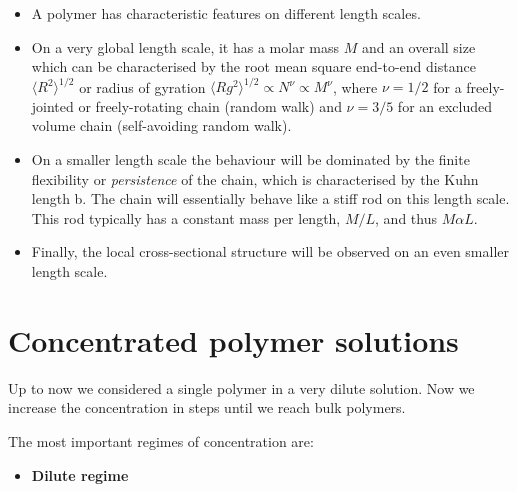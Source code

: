 \documentclass[
  letterpaper,
  enabledeprecatedfontcommands]{report}
\providecommand{\tightlist}{%
  \setlength{\itemsep}{0pt}\setlength{\parskip}{0pt}}
\begin{document}
\begin{tcolorbox}[enhanced jigsaw, toprule=.15mm, opacityback=0, colbacktitle=quarto-callout-important-color!10!white, title=\textcolor{quarto-callout-important-color}{\faExclamation}\hspace{0.5em}{Check your understanding}, leftrule=.75mm, rightrule=.15mm, bottomtitle=1mm, breakable, colframe=quarto-callout-important-color-frame, colback=white, toptitle=1mm, left=2mm, titlerule=0mm, coltitle=black, arc=.35mm, bottomrule=.15mm, opacitybacktitle=0.6]

\begin{itemize}
\item
  A polymer has characteristic features on different length scales.
\item
  On a very global length scale, it has a molar mass \(M\) and an
  overall size which can be characterised by the root mean square
  end-to-end distance \(\langle R^{2}\rangle^{1 / 2}\) or radius of
  gyration
  \(\langle R g^{2}\rangle^{1 / 2 }\propto N^{\nu} \propto M^{\nu}\),
  where \(\nu=1 / 2\) for a freely-jointed or freely-rotating chain
  (random walk) and \(\nu=3 / 5\) for an excluded volume chain
  (self-avoiding random walk).
\item
  On a smaller length scale the behaviour will be dominated by the
  finite flexibility or \emph{persistence} of the chain, which is
  characterised by the Kuhn length b. The chain will essentially behave
  like a stiff rod on this length scale. This rod typically has a
  constant mass per length, \(M / L\), and thus \(M \alpha L\).
\item
  Finally, the local cross-sectional structure will be observed on an
  even smaller length scale.
\end{itemize}

\end{tcolorbox}

\section{Concentrated polymer
solutions}\label{concentrated-polymer-solutions}

Up to now we considered a single polymer in a very dilute solution. Now
we increase the concentration in steps until we reach bulk polymers.

The most important regimes of concentration are:

\begin{itemize}
\tightlist
\item
  \textbf{Dilute regime}
\end{itemize}
\end{document}
